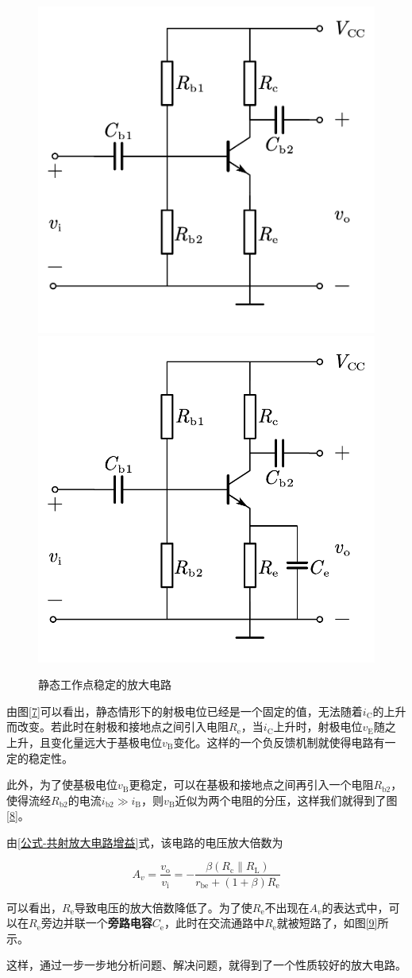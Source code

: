 \begin{figure}[htb]
    \centering
        {\includegraphics[width=0.35\linewidth]{pic/appendixApic/8.pdf}}\qquad
        {\includegraphics[width=0.35\linewidth]{pic/appendixApic/9.pdf}}
        \caption{静态工作点稳定的放大电路\label{静态工作点稳定的放大电路}}
\end{figure}

由图\ref{7}可以看出，静态情形下的射极电位已经是一个固定的值，无法随着$i_\mathrm{C}$的上升而改变。若此时在射极和接地点之间引入电阻$R_{\mathrm{e}}$，当$i_\mathrm{C}$上升时，射极电位$v_\mathrm{E}$随之上升，且变化量远大于基极电位$v_\mathrm{B}$变化。这样的一个负反馈机制就使得电路有一定的稳定性。

此外，为了使基极电位$v_\mathrm{B}$更稳定，可以在基极和接地点之间再引入一个电阻$R_{\mathrm{b2}}$，使得流经$R_{\mathrm{b2}}$的电流$i_{\mathrm{b2}}\gg i_{\mathrm{B}}$，则$v_\mathrm{B}$近似为两个电阻的分压，这样我们就得到了图\ref{8}。

由\ref{公式-共射放大电路增益}式，该电路的电压放大倍数为

\begin{equation}
    A_v=\frac{v_\mathrm{o}}{v_\mathrm{i}}=-\frac{\beta (R_\mathrm{c}\parallel R_\mathrm{L})}{r_\mathrm{be}+(1+\beta)R_\mathrm{e}}
\end{equation}

可以看出，$R_\mathrm{e}$导致电压的放大倍数降低了。为了使$R_\mathrm{e}$不出现在$A_v$的表达式中，可以在$R_\mathrm{e}$旁边并联一个\textbf{旁路电容}$C_\mathrm{e}$，此时在交流通路中$R_\mathrm{e}$就被短路了，如图\ref{9}所示。

这样，通过一步一步地分析问题、解决问题，就得到了一个性质较好的放大电路。